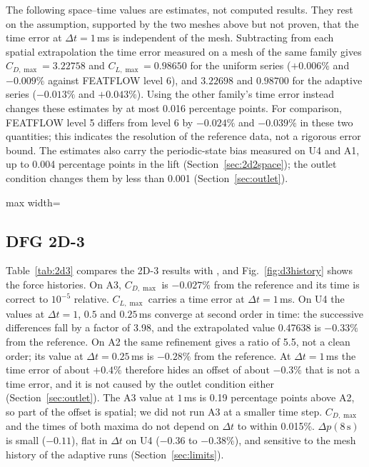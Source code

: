 \documentclass[preprint,12pt,number]{elsarticle}
\newcommand{\fittable}[1]{{\small\setlength{\tabcolsep}{4pt}\begin{adjustbox}{max width=\textwidth}\end{adjustbox}}}
\newcommand{\dt}{\Delta t}
\begin{document}
The following space--time values are estimates, not computed results. They rest on the
assumption, supported by the two meshes above but not proven, that the time error at
$\dt = 1\,$ms is independent of the mesh. Subtracting from each spatial extrapolation the time
error measured on a mesh of the same family gives $C_{D,\max} = 3.22758$ and $C_{L,\max} =
0.98650$ for the uniform series ($+0.006\%$ and $-0.009\%$ against FEATFLOW level 6), and
$3.22698$ and $0.98700$ for the adaptive series ($-0.013\%$ and $+0.043\%$). Using the other
family's time error instead changes these estimates by at most 0.016 percentage points. For
comparison, FEATFLOW level 5 differs from level 6 by $-0.024\%$ and $-0.039\%$ in these two
quantities; this indicates the resolution of the reference data, not a rigorous error bound. The
estimates also carry the periodic-state bias measured on U4 and A1, up to 0.004 percentage points in the lift
(Section~\ref{sec:2d2space}); the outlet condition changes them by less than 0.001
(Section~\ref{sec:outlet}).

\begin{table}[!htbp]
\centering
\caption{DFG 2D-2, meshes A2 and U4: time-step study. Values and differences between
successive $\dt$.}
\label{tab:dt}
\fittable{tables/tab_dt.tex}
\end{table}

\subsection{DFG 2D-3}

Table~\ref{tab:2d3} compares the 2D-3 results with \citet{john2004}, and
Fig.~\ref{fig:d3history} shows the force histories. On A3, $C_{D,\max}$ is $-0.027\%$ from the
reference and its time is correct to $10^{-5}$ relative. $C_{L,\max}$ carries a time error at
$\dt = 1\,$ms. On U4 the values at $\dt = 1$, $0.5$ and $0.25\,$ms converge at second order in
time: the successive differences fall by a factor of 3.98, and the extrapolated value
0.47638 is $-0.33\%$ from the reference. On A2 the same refinement gives a ratio of 5.5, not a
clean order; its value at $\dt = 0.25\,$ms is $-0.28\%$ from the reference. At $\dt = 1\,$ms the
time error of about $+0.4\%$ therefore hides an offset of about $-0.3\%$ that is not a time
error, and it is not caused by the outlet condition either (Section~\ref{sec:outlet}). The A3
value at $1\,$ms is 0.19 percentage points above A2, so part of the offset is spatial; we did not run A3 at a smaller time step. $C_{D,\max}$ and the times of both maxima do
not depend on $\dt$ to within 0.015\%. $\Delta p(8\,\mathrm{s})$ is small ($-0.11$), flat in
$\dt$ on U4 ($-0.36$ to $-0.38\%$), and sensitive to the mesh history of the adaptive runs
(Section~\ref{sec:limits}).
\end{document}
